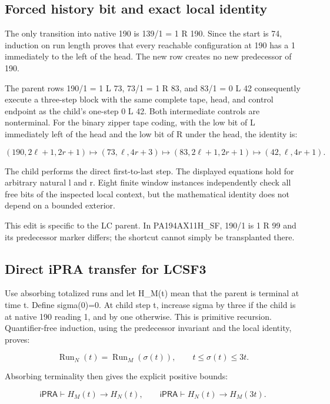 \documentclass[10pt,a4paper]{article}
\begin{document}
\subsection{Forced history bit and exact local identity}\label{forced-history-bit-and-exact-local-identity}

The only transition into native 190 is 139/1 = 1 R 190. Since the start is 74, induction on run length proves that every reachable configuration at 190 has a 1 immediately to the left of the head. The new row creates no new predecessor of 190.

The parent rows 190/1 = 1 L 73, 73/1 = 1 R 83, and 83/1 = 0 L 42 consequently execute a three-step block with the same complete tape, head, and control endpoint as the child's one-step 0 L 42. Both intermediate controls are nonterminal. For the binary zipper tape coding, with the low bit of L immediately left of the head and the low bit of R under the head, the identity is:

\[
(190,2\ell+1,2r+1)\longmapsto(73,\ell,4r+3)\longmapsto(83,2\ell+1,2r+1)\longmapsto(42,\ell,4r+1).
\]

The child performs the direct first-to-last step. The displayed equations hold for arbitrary natural l and r. Eight finite window instances independently check all free bits of the inspected local context, but the mathematical identity does not depend on a bounded exterior.

This edit is specific to the LC parent. In PA194AX11H\_SF, 190/1 is 1 R 99 and its predecessor marker differs; the shortcut cannot simply be transplanted there.

\subsection{Direct iPRA transfer for LCSF3}\label{direct-ipra-transfer-for-lcsf3}

Use absorbing totalized runs and let H\_M(t) mean that the parent is terminal at time t. Define sigma(0)=0. At child step t, increase sigma by three if the child is at native 190 reading 1, and by one otherwise. This is primitive recursion. Quantifier-free induction, using the predecessor invariant and the local identity, proves:

\[
\operatorname{Run}_N(t)=\operatorname{Run}_M(\sigma(t)),\qquad t\leq\sigma(t)\leq3t.
\]

Absorbing terminality then gives the explicit positive bounds:

\[
\mathsf{iPRA}\vdash H_M(t)\to H_N(t),\qquad
\mathsf{iPRA}\vdash H_N(t)\to H_M(3t).
\]
\end{document}
